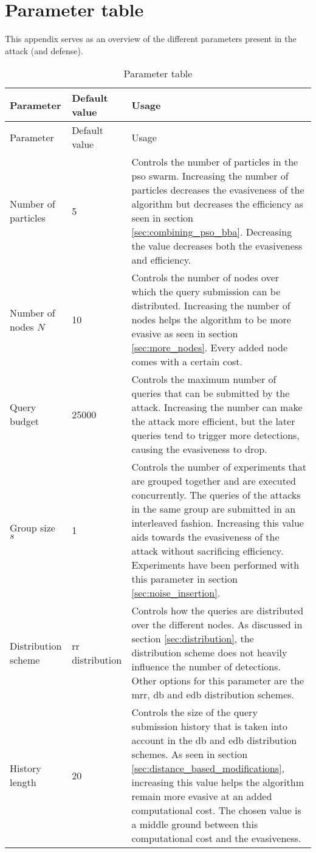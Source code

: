 \chapter{Parameter table}\label{app:parameter_tables}
This appendix serves as an overview of the different parameters present in the attack (and defense). 
\centering
\renewcommand*{\arraystretch}{1.7}
\begin{longtable}{p{3cm}p{2.5cm}p{7cm}}
\caption{Parameter table}
\label{tbl:parameter_table}\\
\toprule
Parameter &Default value &Usage \\ \midrule \endfirsthead
\toprule
Parameter &Default value &Usage \\ \midrule \endhead
\bottomrule\endfoot
Number of  particles	&5 &Controls the number of particles in the \gls{pso} swarm. Increasing the number of particles decreases the evasiveness of the algorithm but decreases the efficiency as seen in section \ref{sec:combining_pso_bba}. Decreasing the value decreases both the evasiveness and efficiency.\\
Number of nodes $N$&10 &Controls the number of nodes over which the query submission can be distributed. Increasing the number of nodes helps the algorithm to be more evasive as seen in section \ref{sec:more_nodes}. Every added node comes with a certain cost.\\
Query budget &25000 &Controls the maximum number of queries that can be submitted by the attack. Increasing the number can make the attack more efficient, but the later queries tend to trigger more detections, causing the evasiveness to drop.\\
Group size $s$ &1 &Controls the number of experiments that are grouped together and are executed concurrently. The queries of the attacks in the same group are submitted in an interleaved fashion. Increasing this value aids towards the evasiveness of the attack without sacrificing efficiency. Experiments have been performed with this parameter in section \ref{sec:noise_insertion}.\\
Distribution scheme &\gls{rr} distribution &Controls how the queries are distributed over the different nodes. As discussed in section \ref{sec:distribution}, the distribution scheme does not heavily influence the number of detections. Other options for this parameter are the \gls{mrr}, \gls{db} and \gls{edb} distribution schemes.\\
History length	&20	&Controls the size of the query submission history that is taken into account in the \gls{db} and \gls{edb} distribution schemes. As seen in section \ref{sec:distance_based_modifications}, increasing this value helps the algorithm remain more evasive at an added computational cost. The chosen value is a middle ground between this computational cost and the evasiveness.\\

\end{longtable}
